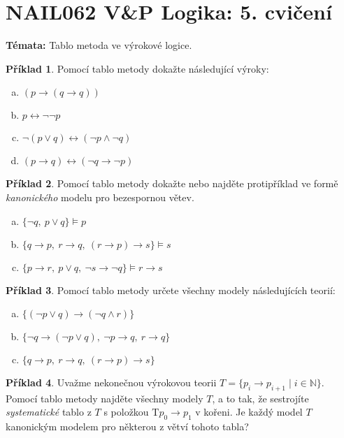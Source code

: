 \documentclass[a4paper]{article}
\theoremstyle{definition}
\newtheorem{problem}{Příklad}
\begin{document}
\section*{NAIL062 V\&P Logika: 5. cvičení}


\textbf{Témata:} 
Tablo metoda ve výrokové logice. 


\medskip\begin{problem}
    Pomocí tablo metody dokažte následující výroky:
    \begin{enumerate}[(a)]
    \item $(p\to (q \to q))$
    \item $p \leftrightarrow \neg \neg  p$
    \item $\neg (p \vee q) \leftrightarrow (\neg p \wedge \neg q)$
    \item $(p \to q) \leftrightarrow (\neg q \to \neg p)$    
    \end{enumerate}
\end{problem} 
   

\medskip\begin{problem}
    Pomocí tablo metody dokažte nebo najděte protipříklad ve formě \emph{kanonického} modelu pro bezespornou větev.
    \begin{enumerate}[(a)]
    \item $\{ \neg q,\ p \vee q\} \models p$
    \item $\{ q \to p,\ r \to q,\ (r \to p) \to s\} \models s$
    \item $\{ p \to r,\ p \vee q,\ \neg s \to \neg q\} \models r \to s$
    \end{enumerate}
\end{problem}
  

\medskip\begin{problem}
    Pomocí tablo metody určete všechny modely následujících teorií:
    \begin{enumerate}[(a)]
    \item $\{(\neg p \vee q) \to (\neg q \wedge r)\}$
    \item $\{\neg q \to (\neg p \vee q),\ \neg p \to q,\ r \to q\}$
    \item $\{ q \to p,\ r \to q,\ (r \to p) \to s\}$
    \end{enumerate}
\end{problem}


\medskip\begin{problem}
    Uvažme nekonečnou výrokovou teorii $T=\{p_i \to p_{i+1}\mid i\in \mathbb{N}\}$. Pomocí tablo metody najděte všechny modely $T$, a to tak, že sestrojíte \emph{systematické} tablo z $T$ s položkou $\mathrm{T}p_0\to p_1$ v kořeni. Je každý model $T$ kanonickým modelem pro některou z větví tohoto tabla?
\end{problem}
\end{document}
